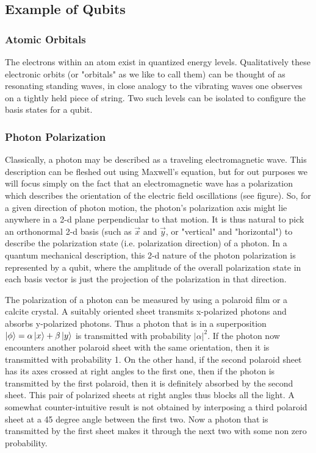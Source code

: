 \subsection{Example of Qubits}
\subsubsection{Atomic Orbitals}
The electrons within an atom exist in quantized energy levels. Qualitatively these electronic orbits (or "orbitals" as we like to call them) can be thought of as resonating standing waves, in close analogy to the vibrating waves one observes on a tightly held piece of string. Two such levels can be isolated to configure the basis states for a qubit.

\subsubsection{Photon Polarization}
Classically, a photon may be described as a traveling electromagnetic wave. This description can be fleshed out using Maxwell's equation, but for out purposes we will focus simply on the fact that an electromagnetic wave has a polarization which describes the orientation of the electric field oscillations (see figure). So, for a given direction of photon motion, the photon's polarization axis might lie anywhere in a 2-d plane perpendicular to that motion. It is thus natural to pick an orthonormal 2-d basis (such as $\vec{x}$ and $\vec{y}$, or "vertical" and "horizontal") to describe the polarization state (i.e. polarization direction) of a photon. In a quantum mechanical description, this 2-d nature of the photon polarization is represented by a qubit, where the amplitude of the overall polarization state in each basis vector is just the projection of the polarization in that direction.

The polarization of a photon can be measured by using a polaroid film or a calcite crystal. A suitably oriented sheet transmits x-polarized photons and absorbs y-polarized photons. Thus a photon that is in a superposition $\ket{\phi}=\alpha\ket{x}+\beta \ket{y}$ is transmitted with probability $|\alpha|^2$. If the photon now encounters another polaroid sheet with the same orientation, then it is transmitted with probability 1. On the other hand, if the second polaroid sheet has its axes crossed at right angles to the first one, then if the photon is transmitted by the first polaroid, then it is definitely absorbed by the second sheet. This pair of polarized sheets at right angles thus blocks all the light. A somewhat counter-intuitive result is not obtained by interposing a third polaroid sheet at a 45 degree angle between the first two. Now a photon that is transmitted by the first sheet makes it through the next two with some non zero probability.

